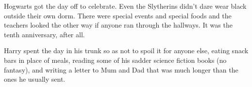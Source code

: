Hogwarts got the day off to celebrate. Even the Slytherins didn't dare wear
black outside their own dorm. There were special events and special foods and
the teachers looked the other way if anyone ran through the hallways. It was
the tenth anniversary, after all.

Harry spent the day in his trunk so as not to spoil it for anyone else, eating
snack bars in place of meals, reading some of his sadder science fiction books
(no fantasy), and writing a letter to Mum and Dad that was much longer than the
ones he usually sent.
